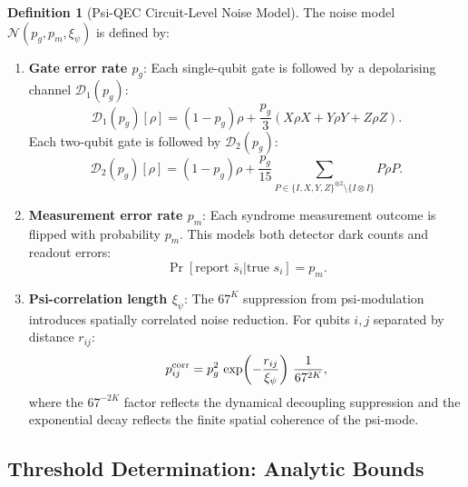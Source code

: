 \documentclass[11pt]{article}
\theoremstyle{definition}
\newtheorem{definition}[theorem]{Definition}
\theoremstyle{remark}
\begin{document}
\begin{definition}[Psi-QEC Circuit-Level Noise Model]
\label{def:noise-model}
The noise model $\mathcal{N}(p_g, p_m, \xi_\psi)$ is defined by:

\begin{enumerate}
  \item \textbf{Gate error rate $p_g$}: Each single-qubit gate is
    followed by a depolarising channel $\mathcal{D}_1(p_g)$:
    \begin{equation}
      \mathcal{D}_1(p_g)[\rho] = (1 - p_g)\rho + \frac{p_g}{3}
      (X\rho X + Y\rho Y + Z\rho Z).
      \label{eq:depolarise-1}
    \end{equation}
    Each two-qubit gate is followed by $\mathcal{D}_2(p_g)$:
    \begin{equation}
      \mathcal{D}_2(p_g)[\rho] = (1 - p_g)\rho + \frac{p_g}{15}
      \sum_{P \in \{I,X,Y,Z\}^{\otimes 2} \setminus \{I\otimes I\}}
      P\rho P.
      \label{eq:depolarise-2}
    \end{equation}

  \item \textbf{Measurement error rate $p_m$}: Each syndrome
    measurement outcome is flipped with probability $p_m$.
    This models both detector dark counts and readout errors:
    \begin{equation}
      \Pr[\text{report } \bar{s}_i | \text{true } s_i] = p_m.
      \label{eq:measurement-error}
    \end{equation}

  \item \textbf{Psi-correlation length $\xi_\psi$}: The $67^K$
    suppression from psi-modulation introduces spatially correlated
    noise reduction. For qubits $i, j$ separated by distance $r_{ij}$:
    \begin{equation}
      p_{ij}^{\rm corr} = p_g^2\,\exp\!\left(-\frac{r_{ij}}{\xi_\psi}
      \right)\,\frac{1}{67^{2K}},
      \label{eq:correlated-noise}
    \end{equation}
    where the $67^{-2K}$ factor reflects the dynamical decoupling
    suppression and the exponential decay reflects the finite spatial
    coherence of the psi-mode.
\end{enumerate}
\end{definition}

\subsection{Threshold Determination: Analytic Bounds}
\label{sec:threshold-analytic}
\end{document}
